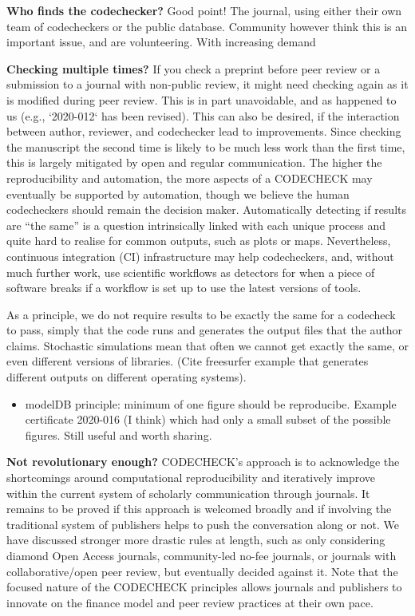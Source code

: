 \documentclass[12pt]{article}
\begin{document}
\textbf{Who finds the codechecker?} Good point! The journal, using either
their own team of codecheckers or the public database. Community
however think this is an important issue, and are volunteering.
With increasing demand 

\textbf{Checking multiple times?} If you check a preprint before peer
review or a submission to a journal with non-public review,
it might need checking again as it is modified during peer
review.  This is in part unavoidable, and as happened to us (e.g., 
`2020-012` has been revised). This can also be desired, if the
interaction between author, reviewer, and codechecker lead to
improvements.
Since checking the manuscript the second time is likely to be
much less work than the first time, this is largely mitigated by 
open and regular communication.
The higher the reproducibility and automation, the more aspects of 
a CODECHECK may eventually be supported by automation, though we believe
the human codecheckers should remain the decision maker.
Automatically detecting if results are ``the same'' is a question
intrinsically linked with each unique process and quite hard to realise
for common outputs, such as plots or maps.
Nevertheless, continuous integration (CI) infrastructure may help 
codecheckers, and, without much further work, use scientific workflows as
detectors for when a piece of software breaks if a workflow is set up to
use the latest versions of tools.

As a principle, we do not require results to be exactly the same for a
codecheck to pass, simply that the code runs and generates the output
files that the author claims. Stochastic simulations mean that often
we cannot get exactly the same, or even different versions of
libraries.  (Cite freesurfer example \cite{Gronenschild2012-pp} that
generates different outputs on different operating systems).

\begin{itemize}
\item modelDB principle: minimum of one figure should be reproducibe.
  Example certificate 2020-016 (I think) which had only a small subset
  of the possible figures. Still useful and worth sharing.
\end{itemize}

\textbf{Not revolutionary enough?}
CODECHECK's approach is to acknowledge the shortcomings around 
computational reproducibility and iteratively improve within the current
system of scholarly communication through journals.
It remains to be proved if this approach is welcomed broadly and if 
involving the traditional system of publishers helps to push the 
conversation along or not.
We have discussed stronger more drastic rules at length, such as only 
considering diamond Open Access journals, community-led no-fee journals,
or journals with collaborative/open peer review, but eventually decided
against it.
Note that the focused nature of the CODECHECK principles allows journals
and publishers to innovate on the finance model and peer review practices
at their own pace.
\end{document}
